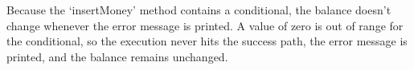 Because the `insertMoney' method contains a conditional, the balance
doesn't change whenever the error message is printed. A value of zero is
out of range for the conditional, so the execution never hits the
success path, the error message is printed, and the balance remains
unchanged.
